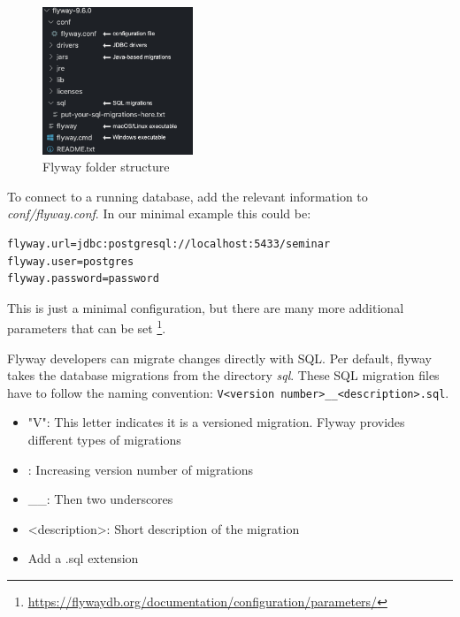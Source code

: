 \begin{figure}[H]
    \centering
    \includegraphics[width=0.4\textwidth]{./chapters/intro_flyway/images/flyway_folder_structure}
   \caption[Flyway folder structure - Source: Own illustration]{Flyway folder structure}
\end{figure}


%
To connect to a running database, add the relevant information to \textit{conf/flyway.conf}.
In our minimal example this could be:

\begin{lstlisting}[caption=Minimal configuration]
flyway.url=jdbc:postgresql://localhost:5433/seminar
flyway.user=postgres
flyway.password=password
\end{lstlisting}

This is just a minimal configuration, but there are many more additional parameters that can be set \footnote{\url{https://flywaydb.org/documentation/configuration/parameters/}}.

%
Flyway developers can migrate changes directly with SQL. Per default, flyway takes the database migrations from the directory \textit{sql}.
These SQL migration files have to follow the naming convention: \texttt{V<version number>\_\_<description>.sql}.

\begin{itemize}
    \item "V": This letter indicates it is a versioned migration. Flyway provides different types of migrations
    \item <version number>: Increasing version number of migrations
    \item \_\_: Then two underscores
    \item <description>: Short description of the migration
    \item Add a .sql extension
\end{itemize}

